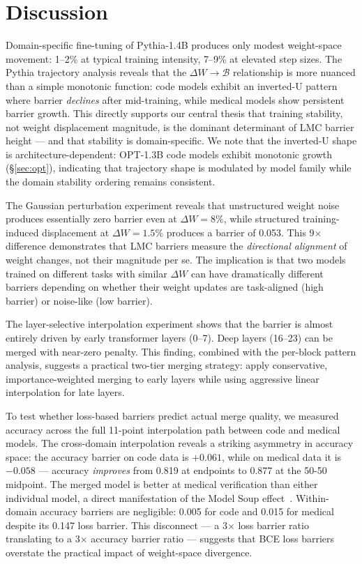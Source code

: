 \documentclass[11pt,a4paper]{article}
\begin{document}
\section{Discussion}

Domain-specific fine-tuning of Pythia-1.4B produces only modest weight-space movement: 1--2\% at typical training intensity, 7--9\% at elevated step sizes. The Pythia trajectory analysis reveals that the $\Delta W \to \mathcal{B}$ relationship is more nuanced than a simple monotonic function: code models exhibit an inverted-U pattern where barrier \emph{declines} after mid-training, while medical models show persistent barrier growth. This directly supports our central thesis that training stability, not weight displacement magnitude, is the dominant determinant of LMC barrier height — and that stability is domain-specific. We note that the inverted-U shape is architecture-dependent: OPT-1.3B code models exhibit monotonic growth (\S\ref{sec:opt}), indicating that trajectory shape is modulated by model family while the domain stability ordering remains consistent.

The Gaussian perturbation experiment reveals that unstructured weight noise produces essentially zero barrier even at $\Delta W = 8\%$, while structured training-induced displacement at $\Delta W = 1.5\%$ produces a barrier of 0.053. This 9$\times$ difference demonstrates that LMC barriers measure the \emph{directional alignment} of weight changes, not their magnitude per se. The implication is that two models trained on different tasks with similar $\Delta W$ can have dramatically different barriers depending on whether their weight updates are task-aligned (high barrier) or noise-like (low barrier).

The layer-selective interpolation experiment shows that the barrier is almost entirely driven by early transformer layers (0--7). Deep layers (16--23) can be merged with near-zero penalty. This finding, combined with the per-block pattern analysis, suggests a practical two-tier merging strategy: apply conservative, importance-weighted merging to early layers while using aggressive linear interpolation for late layers.

To test whether loss-based barriers predict actual merge quality, we measured accuracy across the full 11-point interpolation path between code and medical models. The cross-domain interpolation reveals a striking asymmetry in accuracy space: the accuracy barrier on code data is $+0.061$, while on medical data it is $-0.058$ — accuracy \emph{improves} from 0.819 at endpoints to 0.877 at the 50-50 midpoint. The merged model is better at medical verification than either individual model, a direct manifestation of the Model Soup effect~\cite{wortsman2022soups}. Within-domain accuracy barriers are negligible: 0.005 for code and 0.015 for medical despite its 0.147 loss barrier. This disconnect — a 3$\times$ loss barrier ratio translating to a 3$\times$ accuracy barrier ratio — suggests that BCE loss barriers overstate the practical impact of weight-space divergence.
\end{document}
